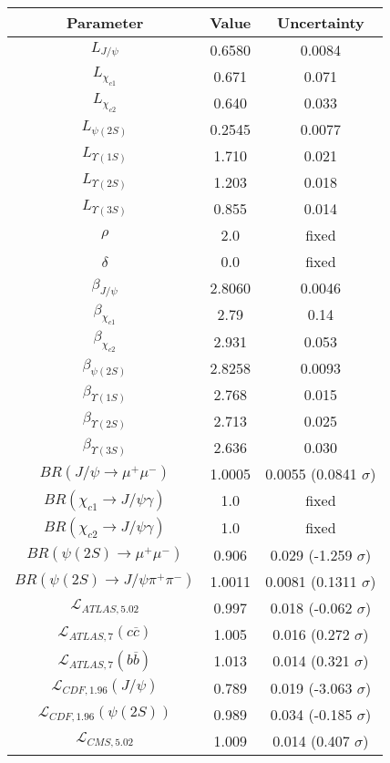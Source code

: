 \begin{table}[h!]
\centering
\begin{tabular}{c|c|c}
Parameter & Value & Uncertainty \\
\hline
$L_{J/\psi}$ & 0.6580 & 0.0084 \\
$L_{\chi_{c1}}$ & 0.671 & 0.071 \\
$L_{\chi_{c2}}$ & 0.640 & 0.033 \\
$L_{\psi(2S)}$ & 0.2545 & 0.0077 \\
$L_{\Upsilon(1S)}$ & 1.710 & 0.021 \\
$L_{\Upsilon(2S)}$ & 1.203 & 0.018 \\
$L_{\Upsilon(3S)}$ & 0.855 & 0.014 \\
$\rho$ & 2.0 & fixed \\
$\delta$ & 0.0 & fixed \\
$\beta_{J/\psi}$ & 2.8060 & 0.0046 \\
$\beta_{\chi_{c1}}$ & 2.79 & 0.14 \\
$\beta_{\chi_{c2}}$ & 2.931 & 0.053 \\
$\beta_{\psi(2S)}$ & 2.8258 & 0.0093 \\
$\beta_{\Upsilon(1S)}$ & 2.768 & 0.015 \\
$\beta_{\Upsilon(2S)}$ & 2.713 & 0.025 \\
$\beta_{\Upsilon(3S)}$ & 2.636 & 0.030 \\
$BR(J/\psi\rightarrow\mu^+\mu^-)$ & 1.0005 & 0.0055 (0.0841 $\sigma$) \\
$BR(\chi_{c1}\rightarrow J/\psi\gamma)$ & 1.0 & fixed \\
$BR(\chi_{c2}\rightarrow J/\psi\gamma)$ & 1.0 & fixed \\
$BR(\psi(2S)\rightarrow\mu^+\mu^-)$ & 0.906 & 0.029 (-1.259 $\sigma$) \\
$BR(\psi(2S)\rightarrow J/\psi\pi^+\pi^-)$ & 1.0011 & 0.0081 (0.1311 $\sigma$) \\
$\mathcal L_{ATLAS,5.02}$ & 0.997 & 0.018 (-0.062 $\sigma$) \\
$\mathcal L_{ATLAS,7}(c\overline c)$ & 1.005 & 0.016 (0.272 $\sigma$) \\
$\mathcal L_{ATLAS,7}(b\overline b)$ & 1.013 & 0.014 (0.321 $\sigma$) \\
$\mathcal L_{CDF,1.96}(J/\psi)$ & 0.789 & 0.019 (-3.063 $\sigma$) \\
$\mathcal L_{CDF,1.96}(\psi(2S))$ & 0.989 & 0.034 (-0.185 $\sigma$) \\
$\mathcal L_{CMS,5.02}$ & 1.009 & 0.014 (0.407 $\sigma$) \\

\end{tabular}
\end{table}
